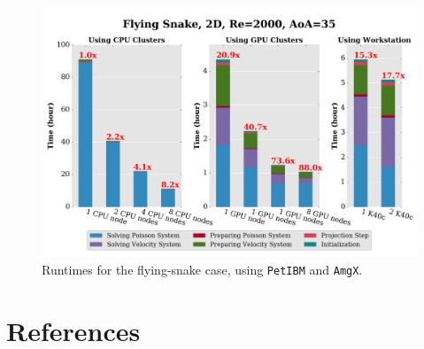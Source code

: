 \documentclass[review]{elsarticle}
\begin{document}
\begin{figure}[h!]
\centering
\includegraphics[width=12cm]{images/flying_snake_performances.png}
\caption{Runtimes for the flying-snake case, using \texttt{PetIBM} and \texttt{AmgX}.}
\label{flying_snake_performances}
\end{figure}

\section*{References}


\end{document}
